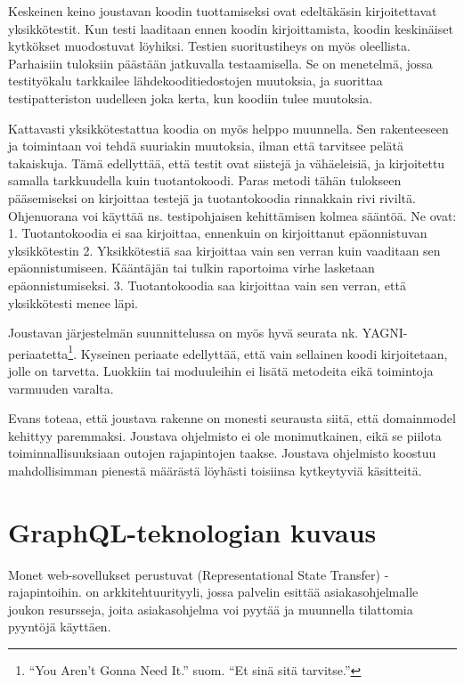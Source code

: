 Keskeinen keino joustavan koodin tuottamiseksi ovat edeltäkäsin
kirjoitettavat yksikkötestit. Kun testi laaditaan ennen koodin
kirjoittamista, koodin keskinäiset kytkökset muodostuvat löyhiksi.
Testien suoritustiheys on myös oleellista. Parhaisiin tuloksiin päästään
jatkuvalla testaamisella. Se on menetelmä, jossa testityökalu tarkkailee
lähdekooditiedostojen muutoksia, ja suorittaa testipatteriston uudelleen
joka kerta, kun koodiin tulee muutoksia. \cite[luku 6]{beck2004extreme}

Kattavasti yksikkötestattua koodia on myös helppo muunnella. Sen
rakenteeseen ja toimintaan voi tehdä suuriakin muutoksia, ilman että
tarvitsee pelätä takaiskuja. Tämä edellyttää, että testit ovat siistejä
ja vähäeleisiä, ja kirjoitettu samalla tarkkuudella kuin tuotantokoodi.
Paras metodi tähän tulokseen pääsemiseksi on kirjoittaa testejä ja
tuotantokoodia rinnakkain rivi riviltä. Ohjenuorana voi käyttää ns.
testipohjaisen kehittämisen kolmea sääntöä. Ne ovat: 1. Tuotantokoodia
ei saa kirjoittaa, ennenkuin on kirjoittanut epäonnistuvan yksikkötestin
2. Yksikkötestiä saa kirjoittaa vain sen verran kuin vaaditaan sen
epäonnistumiseen. Kääntäjän tai tulkin raportoima virhe lasketaan
epäonnistumiseksi. 3. Tuotantokoodia saa kirjoittaa vain sen verran,
että yksikkötesti menee läpi.\cite[luku 9]{martin2008clean}

Joustavan järjestelmän suunnittelussa on myös hyvä seurata nk.
YAGNI-periaatetta\footnote{``You Aren't Gonna Need It.'' suom. ``Et sinä
  sitä tarvitse.''}. Kyseinen periaate edellyttää, että vain sellainen
koodi kirjoitetaan, jolle on tarvetta. Luokkiin tai moduuleihin ei
lisätä metodeita eikä toimintoja varmuuden varalta. \cite{jeffries1998}

Evans toteaa, että joustava rakenne on monesti seurausta siitä, että
\gls{domainmodel} kehittyy paremmaksi. Joustava ohjelmisto ei ole
monimutkainen, eikä se piilota toiminnallisuuksiaan outojen rajapintojen
taakse. Joustava ohjelmisto koostuu mahdollisimman pienestä määrästä
löyhästi toisiinsa kytkeytyviä käsitteitä.\cite[luku 10]{evans:ddd}

\hypertarget{graphql-teknologian-kuvaus}{%
\section{GraphQL-teknologian kuvaus}\label{graphql-teknologian-kuvaus}}

Monet web-sovellukset perustuvat  (Representational
State Transfer) -rajapintoihin.  on
arkkitehtuurityyli, jossa palvelin esittää asiakasohjelmalle joukon
resursseja, joita asiakasohjelma voi pyytää ja muunnella tilattomia
pyyntöjä käyttäen.\cite{fielding2000architectural}

